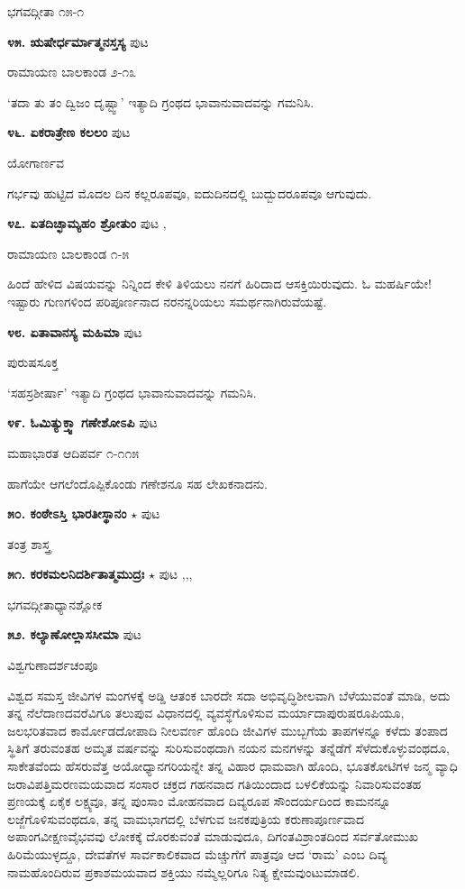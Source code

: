 \hfill ಭಗವದ್ಗೀತಾ ೧೫-೧

\medskip
\noindent\textbf{೪೫. ಋಷೇರ್ಧರ್ಮಾತ್ಮನಸ್ತಸ್ಯ} \hfill ಪುಟ \pageref{165d}

\hfill ರಾಮಾಯಣ ಬಾಲಕಾಂಡ ೨-೧೩

`ತದಾ ತು ತಂ ದ್ವಿಜಂ ದೃಷ್ಟ್ವಾ' ಇತ್ಯಾದಿ ಗ್ರಂಥದ ಭಾವಾನುವಾದವನ್ನು ಗಮನಿಸಿ.

\medskip
\noindent\textbf{೪೬. ಏಕರಾತ್ರೇಣ ಕಲಲಂ} \hfill ಪುಟ \pageref{85}

\hfill ಯೋಗಾರ್ಣವ

ಗರ್ಭವು ಹುಟ್ಟಿದ ಮೊದಲ ದಿನ ಕಲ್ಲರೂಪವೂ, ಐದುದಿನದಲ್ಲಿ ಬುದ್ಬುದರೂಪವೂ ಆಗುವುದು.

\medskip
\noindent\textbf{೪೭. ಏತದಿಚ್ಛಾಮ್ಯಹಂ ಶ್ರೋತುಂ} \hfill ಪುಟ \pageref{153a},\pageref{194d}

\hfill ರಾಮಾಯಣ ಬಾಲಕಾಂಡ ೧-೫

ಹಿಂದೆ ಹೇಳಿದ ವಿಷಯವನ್ನು ನಿನ್ನಿಂದ ಕೇಳಿ ತಿಳಿಯಲು ನನಗೆ ಹಿರಿದಾದ ಆಸಕ್ತಿಯಿರುವುದು. ಓ ಮಹರ್ಷಿಯೇ! ಇಷ್ಟಾರು ಗುಣಗಳಿಂದ ಪರಿಪೂರ್ಣನಾದ ನರನನ್ನರಿಯಲು ಸಮರ್ಥನಾಗಿರುವೆಯಷ್ಟೆ.

\medskip
\noindent\textbf{೪೮. ಏತಾವಾನಸ್ಯ ಮಹಿಮಾ} \hfill ಪುಟ \pageref{249f}

\hfill ಪುರುಷಸೂಕ್ತ

`ಸಹಸ್ರಶೀರ್ಷಾ' ಇತ್ಯಾದಿ ಗ್ರಂಥದ ಭಾವಾನುವಾದವನ್ನು ಗಮನಿಸಿ.

\medskip
\noindent\textbf{೪೯. ಓಮಿತ್ಯುಕ್ತ್ವಾ ಗಣೇಶೋಽಪಿ} \hfill ಪುಟ \pageref{119b}

\hfill ಮಹಾಭಾರತ ಆದಿಪರ್ವ ೧-೧೧೫

ಹಾಗೆಯೇ ಆಗಲೆಂದೊಪ್ಪಿಕೊಂಡು ಗಣೇಶನೂ ಸಹ ಲೇಖಕನಾದನು.

\medskip
\noindent\textbf{೫೦. ಕಂಠೇಽಸ್ತಿ ಭಾರತೀಸ್ಥಾನಂ} $\star$ \hfill ಪುಟ \pageref{31c}

\hfill ತಂತ್ರ ಶಾಸ್ತ್ರ

\medskip
\noindent\textbf{೫೧. ಕರಕಮಲನಿದರ್ಶಿತಾತ್ಮಮುದ್ರಃ} $\star$ \hfill ಪುಟ \pageref{48},\pageref{92},\pageref{217},\pageref{226}

\hfill ಭಗವದ್ಗೀತಾಧ್ಯಾನಶ್ಲೋಕ

\medskip
\noindent\textbf{೫೨. ಕಲ್ಯಾಣೋಲ್ಲಾಸಸೀಮಾ} \hfill ಪುಟ \pageref{206}

\hfill ವಿಶ್ವಗುಣಾದರ್ಶಚಂಪೂ

ವಿಶ್ವದ ಸಮಸ್ತ ಜೀವಿಗಳ ಮಂಗಳಕ್ಕೆ  ಅಡ್ಡಿ ಆತಂಕ ಬಾರದೇ ಸದಾ ಅಭಿವೃದ್ಧಿಶೀಲವಾಗಿ ಬೆಳೆಯುವಂತೆ ಮಾಡಿ, ಅದು ತನ್ನ ನೆಲೆದಾಣದವರೆವಿಗೂ ತಲುಪುವ ವಿಧಾನದಲ್ಲಿ ವ್ಯವಸ್ಥೆಗೊಳಿಸುವ ಮರ್ಯಾದಾಪುರುಷರೂಪಿಯೂ, ಜಲಭರಿತವಾದ ಕಾರ್ಮೋಡದೋಪಾದಿ ನೀಲವರ್ಣ ಹೊಂದಿ ಜೀವಿಗಳ ಮುಬ್ಬಗೆಯ ತಾಪಗಳನ್ನೂ ಕಳೆದು ತಂಪಾದ ಸ್ಥಿತಿಗೆ ತರುವಂತಹ ಅಮೃತ ವರ್ಷವನ್ನು ಸುರಿಸುವಂಥದಾಗಿ ನಯನ ಮನಗಳನ್ನು ತನ್ನೆಡೆಗೆ ಸೆಳೆದುಕೊಳ್ಳುವಂಥದೂ, ಸಾಕೇತವೆಂದು ಹೆಸರುವೆತ್ತ ಅಯೋಧ್ಯಾನಗರಿಯನ್ನೇ ತನ್ನ ವಿಹಾರ ಧಾಮವಾಗಿ ಹೊಂದಿ, ಭೂತಕೋಟಿಗಳ ಜನ್ಮ ವ್ಯಾಧಿ ಜರಾವಿಪತ್ತಿಮರಣಮಯವಾದ ಸಂಸಾರ ಚಕ್ರದ ಗಹನವಾದ ಗತಿಯಿಂದಾದ ಬಳಲಿಕೆಯನ್ನು ನಿವಾರಿಸುವಂತಹ ಪ್ರಣಯಕ್ಕೆ ಏಕೈಕ ಲಕ್ಷ್ಯವೂ, ತನ್ನ ಪುಂಸಾಂ ಮೋಹನವಾದ ದಿವ್ಯರೂಪ ಸೌಂದರ್ಯದಿಂದ ಕಾಮನನ್ನೂ ಲಜ್ಜೆಗೊಳಿಸುವಂಥದೂ, ತನ್ನ ವಾಮಭಾಗದಲ್ಲಿ ಬೆಳಗುವ ಜನಕಪುತ್ರಿಯ ಕರುಣಾಪೂರ್ಣವಾದ ಅಪಾಂಗವೀಕ್ಷಣವೈಭವವು ಲೋಕಕ್ಕೆ ದೊರಕುವಂತೆ ಮಾಡುವುದೂ, ದಿಗಂತವಿಶ್ರಾಂತದಿಂದ ಸರ್ವತೋಮುಖ ಹಿರಿಮೆಯುಳ್ಳದ್ದೂ, ದೇವತೆಗಳ ಸಾರ್ವಕಾಲಿಕವಾದ ಮೆಚ್ಚುಗೆಗೆ ಪಾತ್ರವೂ ಆದ `ರಾಮ' ಎಂಬ ದಿವ್ಯ ನಾಮಹೊಂದಿರುವ ಪ್ರಕಾಶಮಯವಾದ ಶಕ್ತಿಯು ನಮ್ಮೆಲ್ಲರಿಗೂ ನಿತ್ಯ ಕ್ಷೇಮವುಂಟುಮಾಡಲಿ.

